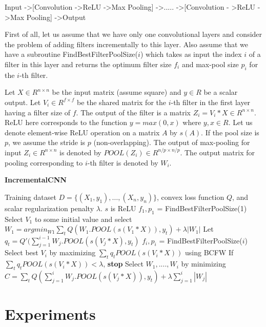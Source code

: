 \documentclass{article}
\begin{document}
Input -\textgreater [Convolution -\textgreater ReLU -\textgreater Max Pooling] -\textgreater ..... -\textgreater [Convolution - \textgreater ReLU -\textgreater Max Pooling] -\textgreater Output

First of all, let us assume that we have only one convolutional layers and consider the problem of adding filters incrementally to this layer. Also assume that we have a subroutine FindBestFilterPoolSize($i$) which takes as input the index $i$ of a filter in this layer and returns the optimum filter size $f_i$ and max-pool size $p_i$ for the $i$-th filter.

Let $X \in R^{n \times n}$ be the input matrix (assume square) and $y \in R$ be a scalar output. Let $V_i \in R^{f \times f}$ be the shared matrix for the $i$-th filter in the first layer having a filter size of $f$. The output of the filter is a matrix $Z_i = V_i * X \in R^{n \times n}$. ReLU here corresponds to the function $y = max(0, x)$ where $y, x \in R$. Let us denote element-wise ReLU operation on a matrix $A$ by $s(A)$. If the pool size is $p$, we assume the stride is $p$ (non-overlapping). The output of max-pooling for input $Z_i \in R^{n \times n}$ is denoted by $POOL(Z_i) \in R^{n/p \times n/p}$. The output matrix for pooling corresponding to $i$-th filter is denoted by $W_i$.

\begin{algorithm}
\caption{{\bf IncrementalCNN}}\label{incremental_algo}
\begin{algorithmic}
 Training dataset $D = \{(X_1, y_1), \dots, (X_n, y_n)\}$, convex loss function $Q$, and scalar regularization penalty $\lambda$. $s$ is ReLU
\STATE $f_1, p_1$ = FindBestFilterPoolSize(1)
\STATE Select $V_1$ to some initial value and select $W_1 = argmin_{W1} \sum_t Q(W_1.POOL(s(V_1 * X)), y_t) + \lambda |W_1|$
\STATE Let $q_t = Q'(\sum_{j = 1}^{i - 1} W_j . POOL(s(V_j * X), y_t)$ 
\STATE $f_i, p_i$ = FindBestFilterPoolSize($i$)
\STATE Select best $V_i$ by maximizing $\sum_{t} q_t POOL(s(V_i * X))$ using BCFW
\STATE If $\sum_{t} q_t POOL(s(V_i * X)) < \lambda$, {\bf stop}
\STATE Select $W_1, ...., W_i$ by minimizing $C =  \sum_t Q(\sum_{j = 1}^{i} W_j . POOL(s(V_j * X)), y_t) + \lambda \sum_{j = 1}^{i}|W_j|$
\ENDFOR
\end{algorithmic}
\end{algorithm}

\section{Experiments}

\newpage


\end{document}
